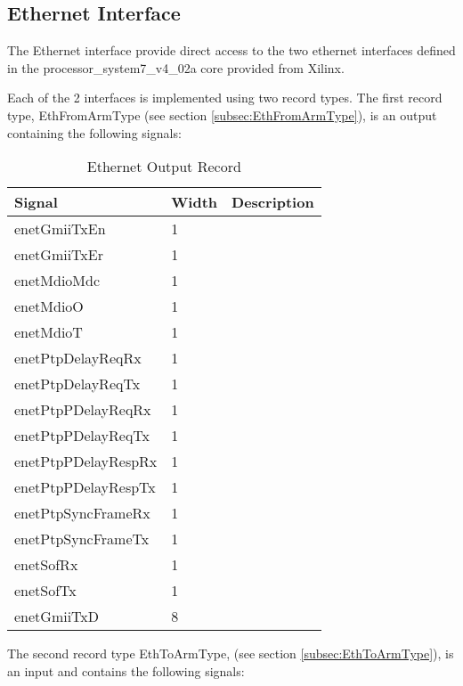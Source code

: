 \documentclass[11pt]{article}
\begin{document}
\subsection{Ethernet Interface}
\label{subsec:external_ethernet}

The Ethernet interface provide direct access to the two ethernet interfaces defined in the processor\_system7\_v4\_02a core provided from Xilinx. 

Each of the 2 interfaces is implemented using two record types. The first record type, EthFromArmType (see section \ref{subsec:EthFromArmType}),
is an output containing the following signals:

\begin{table}[H]
\small
\centering
   \begin{tabular}{| l | l | l | }
      \hline \textbf{Signal} & \textbf{Width}  & \textbf{Description} \\
      \hline enetGmiiTxEn        & 1         & \\
      \hline enetGmiiTxEr        & 1         & \\
      \hline enetMdioMdc         & 1         & \\
      \hline enetMdioO           & 1         & \\
      \hline enetMdioT           & 1         & \\
      \hline enetPtpDelayReqRx   & 1         & \\
      \hline enetPtpDelayReqTx   & 1         & \\
      \hline enetPtpPDelayReqRx  & 1         & \\
      \hline enetPtpPDelayReqTx  & 1         & \\
      \hline enetPtpPDelayRespRx & 1         & \\
      \hline enetPtpPDelayRespTx & 1         & \\
      \hline enetPtpSyncFrameRx  & 1         & \\
      \hline enetPtpSyncFrameTx  & 1         & \\
      \hline enetSofRx           & 1         & \\
      \hline enetSofTx           & 1         & \\
      \hline enetGmiiTxD         & 8         & \\
      \hline
   \end{tabular}
   \caption{Ethernet Output Record}
\end{table}

The second record type EthToArmType, (see section \ref{subsec:EthToArmType}), is an input and contains the following signals:
\end{document}
